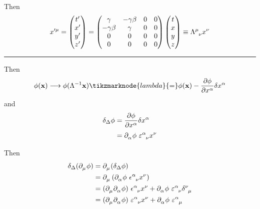 \documentclass{article}
\begin{document}
\noindent Then
\begin{equation*}
    \tensor{x}{^\prime^\mu} = %
    \begin{pmatrix}
        t' \\
        x' \\
        y' \\
        z'
    \end{pmatrix}%
    = %
    \begin{pmatrix}
        \gamma & - \gamma \beta & 0 & 0 \\
        - \gamma \beta & \gamma & 0 & 0 \\
        0 & 0 & 0 & 0 \\
        0 & 0 & 0 & 0
    \end{pmatrix}%
    \begin{pmatrix}
        t \\
        x \\
        y \\
        z
    \end{pmatrix}%
    \equiv \tensor{\Lambda}{^\mu _\nu} \tensor{x}{^\nu}
\end{equation*}

\noindent\rule{\textwidth}{.5pt}


\noindent Then
\begin{equation*}
    \phi (\mathbf{x}) \longrightarrow \phi ( \Lambda^{-1} \mathbf{x} ) \tikzmarknode{lambda}{=} \phi (\mathbf{x}) - \dfrac{ \partial \phi }{ \partial \tensor{x}{^\alpha} } \delta \tensor{x}{^\alpha}
\end{equation*}
and
\begin{align*}
    \delta_\Delta \phi &= \dfrac{ \partial \phi }{ \partial \tensor{x}{^\alpha} } \delta \tensor{x}{^\alpha} \\
    &= \tensor{\partial}{_\alpha} \phi ~ \tensor{\varepsilon}{^\alpha _\nu} \tensor{x}{^\nu}
\end{align*}

\noindent Then
\begin{align*}
    \delta_\Delta ( \tensor{\partial}{_\mu} \phi ) &= \tensor{\partial}{_\mu} ( \delta_\Delta \phi ) \\
    &= \tensor{\partial}{_\mu} \left( \tensor{\partial}{_\alpha} \phi ~ \tensor{\epsilon}{^\alpha _\nu} \tensor{x}{^\nu} \right) \\
    &= ( \tensor{\partial}{_\mu} \tensor{\partial}{_\alpha} \phi ) ~ \tensor{\epsilon}{^\alpha _\nu} \tensor{x}{^\nu} + \tensor{\partial}{_\alpha} \phi ~ \tensor{\varepsilon}{^\alpha _\nu} \tensor{\delta}{^\nu _\mu} \\
    &= ( \tensor{\partial}{_\mu} \tensor{\partial}{_\alpha} \phi ) ~ \tensor{\varepsilon}{^\alpha _\nu} \tensor{x}{^\nu} + \tensor{\partial}{_\alpha} \phi ~ \tensor{\varepsilon}{^\alpha _\mu}
\end{align*}
\end{document}
